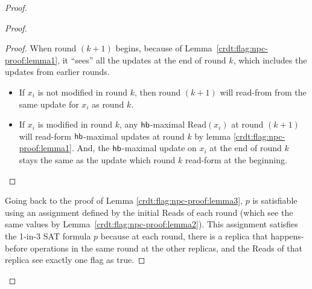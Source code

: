 \begin{proof}
\begin{proof}
\begin{proof}
    When round $(k+1)$ begins, because of Lemma~\ref{crdt:flag:npc-proof:lemma1}, it ``sees'' all the updates at the end of round $k$, which includes the updates from earlier rounds.
    \begin{itemize}
      \item If $x_i$ is not modified in round $k$, then round $(k+1)$ will read-from from the same update for $x_i$ as round $k$.
      \item If $x_i$ is modified in round $k$, any $\textsf{hb}$-maximal $\mathrm{Read}(x_i)$ at round $(k+1)$ will read-form $\textsf{hb}$-maximal updates at round $k$ by lemma \ref{crdt:flag:npc-proof:lemma1}. And, the $\textsf{hb}$-maximal update on $x_i$ at the end of round $k$ stays the same as the update which round $k$ read-form at the beginning. 
    \end{itemize}
  \end{proof}

  Going back to the proof of Lemma \ref{crdt:flag:npc-proof:lemma3}, $p$ is satisfiable using an assignment defined by the initial \textrm{Read}s of each round (which see the same values by Lemma~\ref{crdt:flag:npc-proof:lemma2}). This assignment satisfies the 1-in-3 SAT formula $p$ because at each round, there is a replica that happens-before operations in the same round at the other replicas, and the \textrm{Read}s of that replica see exactly one flag as true.
\end{proof}




\end{proof}
